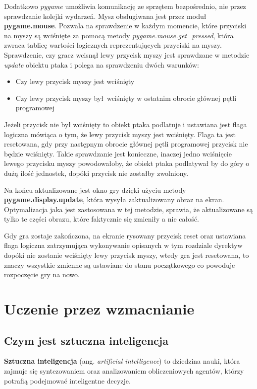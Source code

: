 \documentclass[a4paper,12pt,oneside]{book}
\begin{document}
Dodatkowo \textit{pygame} umożliwia komunikację ze sprzętem bezpośrednio, nie
przez sprawdzanie kolejki wydarzeń. Mysz obsługiwana jest przez moduł
\textbf{pygame.mouse}. Pozwala na sprawdzenie w każdym momencie, które
przyciski na myszy są wciśnięte za pomocą metody
\textit{pygame.mouse.get\_pressed}, która zwraca tablicę wartości logicznych
reprezentujących przyciski na myszy.
Sprawdzenie, czy gracz wcisnął lewy przycisk myszy jest sprawdzane w metodzie
\textit{update} obiektu ptaka i polega na sprawdzeniu dwóch warunków:
\begin{itemize}
	\setlength\itemsep{-0.4em}
	\item Czy lewy przycisk myszy jest wciśnięty
	\item Czy lewy przycisk myszy był wciśnięty w ostatnim obrocie głównej
		pętli programowej
\end{itemize}
Jeżeli przycisk nie był wciśnięty to obiekt ptaka podlatuje i ustawiana jest
flaga logiczna mówiąca o tym, że lewy przycisk myszy jest wciśnięty. Flaga
ta jest resetowana, gdy przy następnym obrocie głównej pętli programowej
przycisk nie będzie wciśnięty. Takie sprawdzanie jest konieczne, inaczej jedno
wciśnięcie lewego przycisku myszy powodowałoby, że obiekt ptaka podlatywał by
do góry o dużą ilość jednostek, dopóki przycisk nie zostałby zwolniony.

Na końcu aktualizowane jest okno gry dzięki użyciu metody
\textbf{pygame.display.update}, która wysyła zaktualizowany obraz na ekran.
Optymalizacja jaka jest zastosowana w tej metodzie, sprawia, że aktualizowane
są tylko te części obrazu, które faktycznie się zmieniły a nie całość.

Gdy gra zostaje zakończona, na ekranie rysowany przycisk reset oraz ustawiana
flaga logiczna zatrzymująca wykonywanie opisanych w tym rozdziale dyrektyw
dopóki nie zostanie wciśnięty lewy przycisk myszy, wtedy gra jest resetowana,
to znaczy wszystkie zmienne są ustawiane do stanu początkowego co powoduje
rozpoczęcie gry na nowo.

\chapter{Uczenie przez wzmacnianie}
\section{Czym jest sztuczna inteligencja}
\textbf{Sztuczna inteligencja} (ang. \textit{artificial intelligence}) to
dziedzina nauki, która zajmuje się syntezowaniem oraz analizowaniem
obliczeniowych agentów, którzy potrafią podejmować inteligentne decyzje.
\end{document}
